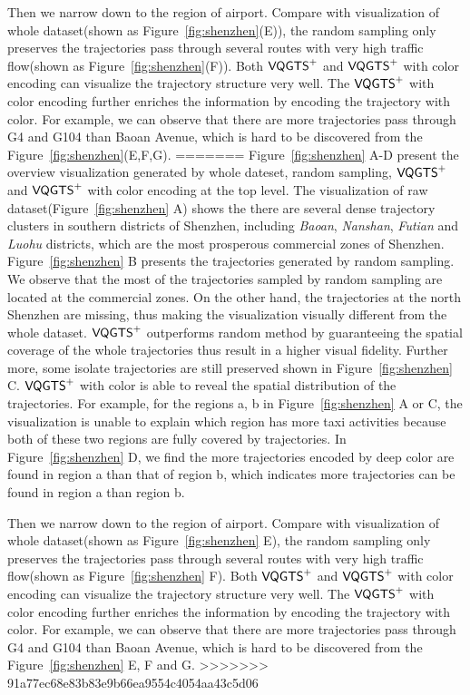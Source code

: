 Then we narrow down to the region of airport. Compare with visualization of whole dataset(shown as Figure~\ref{fig:shenzhen}(E)), the random sampling only preserves the trajectories pass through several routes with very high traffic flow(shown as Figure~\ref{fig:shenzhen}(F)).  Both $\mathsf{VQGTS}^{+}$ and $\mathsf{VQGTS}^{+}$ with color encoding can visualize the trajectory structure very well. The $\mathsf{VQGTS}^{+}$ with color encoding further enriches the information by encoding the trajectory with color. For example, we can observe that there are more trajectories pass through G4 and G104 than Baoan Avenue, which is hard to be discovered from the Figure~\ref{fig:shenzhen}(E,F,G).  
=======
Figure~\ref{fig:shenzhen} A-D present the overview visualization generated by whole dateset, random sampling, $\mathsf{VQGTS}^{+}$ and $\mathsf{VQGTS}^{+}$ with color encoding at the top level. The visualization of raw dataset(Figure~\ref{fig:shenzhen} A) shows the there are several dense trajectory clusters in southern districts of Shenzhen, including \textit{Baoan}, \textit{Nanshan}, \textit{Futian} and \textit{Luohu} districts, which are the most prosperous commercial zones of Shenzhen. Figure~\ref{fig:shenzhen} B presents the trajectories generated by random sampling. We observe that the most of the trajectories sampled by random sampling are located at the commercial zones. On the other hand, the trajectories at the north Shenzhen are missing, thus making the visualization visually different from the whole dataset.
$\mathsf{VQGTS}^{+}$ outperforms random method by guaranteeing the spatial coverage of the whole trajectories thus result in a higher visual fidelity. Further more, some isolate trajectories are still preserved shown in Figure~\ref{fig:shenzhen} C. $\mathsf{VQGTS}^{+}$ with color is able to reveal the spatial distribution of the trajectories. For example, for the regions a, b in Figure~\ref{fig:shenzhen} A or C, the visualization is unable to explain which region has more taxi activities because both of these two regions are fully covered by trajectories. In Figure~\ref{fig:shenzhen} D, we find the more trajectories encoded by deep color are found in region a than that of region b, which indicates more trajectories can be found in region a than region b.

Then we narrow down to the region of airport. Compare with visualization of whole dataset(shown as Figure~\ref{fig:shenzhen} E), the random sampling only preserves the trajectories pass through several routes with very high traffic flow(shown as Figure~\ref{fig:shenzhen} F).  Both $\mathsf{VQGTS}^{+}$ and $\mathsf{VQGTS}^{+}$ with color encoding can visualize the trajectory structure very well. The $\mathsf{VQGTS}^{+}$ with color encoding further enriches the information by encoding the trajectory with color. For example, we can observe that there are more trajectories pass through G4 and G104 than Baoan Avenue, which is hard to be discovered from the Figure~\ref{fig:shenzhen} E, F and G.
>>>>>>> 91a77ec68e83b83e9b66ea9554c4054aa43c5d06

